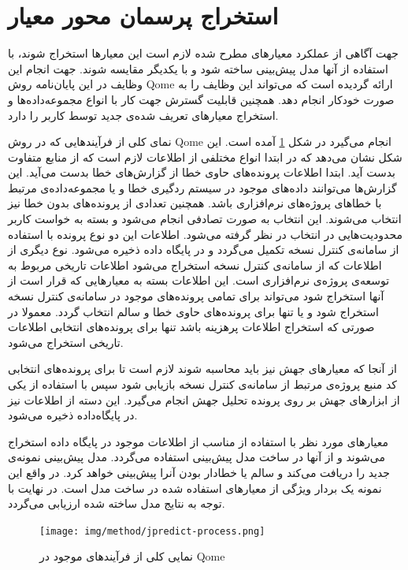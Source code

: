 \section{استخراج پرسمان محور معیار}
جهت آگاهی از عملکرد معیارهای مطرح شده لازم است این معیارها استخراج شوند، با استفاده از آنها مدل پیش‌بینی ساخته شود و با یکدیگر مقایسه شوند. جهت انجام این وظایف   در این پایان‌نامه روش Qome ارائه گردیده است که می‌تواند این وظایف را به صورت خودکار انجام دهد. همچنین قابلیت گسترش جهت کار با انواع مجموعه‌داده‌ها و استخراج معیارهای تعریف شده‌ی جدید توسط کاربر را دارد. 

نمای کلی از فرآیند‌هایی که در روش Qome انجام می‌گیرد در شکل \ref{fig:jpredict-process}  آمده است. این شکل نشان می‌دهد که در ابتدا انواع مختلفی از اطلاعات لازم است که از منابع متفاوت بدست آید. ابتدا اطلاعات پرونده‌های حاوی خطا از گزارش‌های خطا  بدست می‌آید. این گزارش‌ها می‌توانند داده‌های موجود در سیستم ردگیری خطا و یا  مجموعه‌داده‌ی مرتبط با خطاهای پروژه‌های نرم‌افزاری باشد. همچنین تعدادی از پرونده‌های بدون خطا نیز انتخاب می‌شوند. این انتخاب به صورت تصادفی انجام می‌شود و بسته به خواست کاربر محدودیت‌هایی در انتخاب در نظر گرفته می‌شود. اطلاعات این دو نوع پرونده با استفاده از سامانه‌ی کنترل نسخه تکمیل می‌گردد و در پایگاه داده ذخیره می‌شود. نوع دیگری از اطلاعات که از سامانه‌ی کنترل نسخه استخراج می‌شود اطلاعات تاریخی مربوط به توسعه‌ی پروژه‌ی نرم‌افزاری است. این اطلاعات بسته به معیارهایی که قرار است از آنها استخراج شود می‌تواند برای تمامی پرونده‌های موجود در سامانه‌ی کنترل نسخه استخراج شود و یا تنها برای پرونده‌های حاوی خطا و سالم انتخاب گردد. معمولا در صورتی که استخراج اطلاعات پرهزینه باشد تنها برای پرونده‌های انتخابی اطلاعات تاریخی استخراج می‌شود. 

از آنجا که معیارهای جهش نیز باید محاسبه شوند لازم است تا برای پرونده‌های انتخابی کد منبع پروژه‌ی  مرتبط از سامانه‌ی کنترل نسخه بازیابی شود سپس با استفاده از یکی از ابزارهای جهش بر روی  پرونده تحلیل جهش انجام می‌گیرد. این دسته از اطلاعات  نیز در پایگاه‌داده ذخیره می‌شود. 

معیارهای مورد نظر با استفاده  از  مناسب از اطلاعات موجود در پایگاه داده استخراج می‌شوند و از آنها در ساخت مدل پیش‌بینی استفاده می‌گردد. مدل پیش‌بینی نمونه‌ی جدید را دریافت می‌کند و سالم یا خطادار بودن آنرا پیش‌بینی خواهد کرد. در واقع این نمونه یک بردار ویژگی از معیارهای استفاده شده در ساخت مدل است. در نهایت  با توجه به نتایج مدل ساخته شده ارزیابی می‌گردد.

\begin{figure}[H]
	\centering
	\texttt{[image: img/method/jpredict-process.png]}
	\caption{ نمایی کلی از فرآیند‌های موجود در Qome}
	\label{fig:jpredict-process}
\end{figure}


